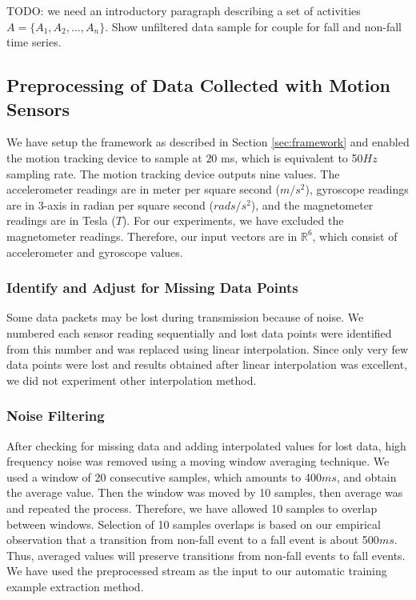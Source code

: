 \documentclass{IEEEtran}
\begin{document}
TODO: we need an introductory paragraph describing a set of activities $A = \{A_1, A_2, 
\dots, A_n\}$. Show unfiltered data sample for couple for fall and non-fall time series. 


\subsection{Preprocessing of Data Collected with Motion Sensors }

We have setup the framework as described in Section \ref{sec:framework} and enabled the 
motion tracking device to sample at $20$ ms, which is equivalent to 50$Hz$ 
sampling rate. The motion tracking device outputs nine values. The  
accelerometer readings are in  meter per square second ($m/s^2$), gyroscope readings are 
in 3-axis in radian per square second ($rads/s^2$), and the magnetometer readings are  in 
Tesla ($T$). For our experiments, we have excluded the magnetometer readings. Therefore, 
our input vectors are in $\mathbb{R}^6$, which consist of accelerometer and gyroscope 
values.

\subsubsection{Identify and Adjust for Missing Data Points}
\label{sec:IdentifyAndAdjustForMissingDataPoints}
Some data packets may be lost during transmission because of noise. We numbered each sensor reading sequentially and lost data points were identified from this number and was replaced using linear interpolation. Since only very few data points were lost and results obtained after linear interpolation was excellent, we did not experiment other interpolation method.

\subsubsection{Noise Filtering}
\label{sec:NoiseFiltering}

After checking for missing data and adding interpolated values for lost data,  high frequency noise was removed using a moving window averaging technique. We used a window  of 20 consecutive samples, which amounts to 400$ms$, 
and obtain the average value. Then the  window was moved by 10 samples, then average was and 
repeated the process. Therefore, we have allowed 10 samples to overlap between windows. 
Selection of 10 samples overlaps is based on our empirical observation that a transition from non-fall event to a fall event is about 500$ms$. Thus, averaged values will preserve transitions from non-fall events to fall events.   We have used the preprocessed stream as the input to our automatic training example 
extraction method.
\end{document}

